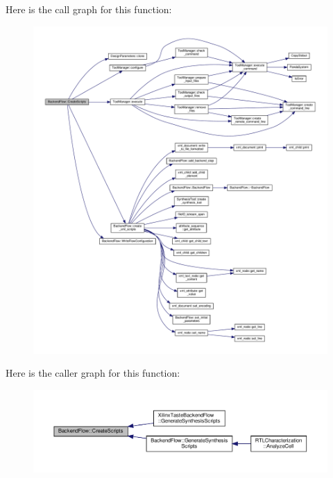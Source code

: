 Here is the call graph for this function\+:
\nopagebreak
\begin{figure}[H]
\begin{center}
\leavevmode
\includegraphics[width=350pt]{da/d75/classBackendFlow_a646198b57b1a235564a955e1f48945bd_cgraph}
\end{center}
\end{figure}
Here is the caller graph for this function\+:
\nopagebreak
\begin{figure}[H]
\begin{center}
\leavevmode
\includegraphics[width=350pt]{da/d75/classBackendFlow_a646198b57b1a235564a955e1f48945bd_icgraph}
\end{center}
\end{figure}
\mbox{\label{classBackendFlow_ac9035b8c54cffb28b61036aed44e5381}} 
